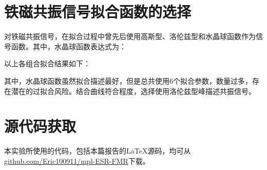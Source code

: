 \documentclass{thuemp}
\begin{document}
\renewcommand\refname{\heiti\wuhao\centerline{参考文献}\global\def\refname{参考文献}}
\vskip 12pt

\let\OLDthebibliography\thebibliography
\renewcommand\thebibliography[1]{
  \OLDthebibliography{#1}
  \setlength{\parskip}{0pt}
  \setlength{\itemsep}{0pt plus 0.3ex}
}

{
\renewcommand{\baselinestretch}{0.9}
\liuhao


}
\newpage
\appendix

\section{铁磁共振信号拟合函数的选择}

对铁磁共振信号，在拟合过程中曾先后使用高斯型、洛伦兹型和水晶球函数作为信号函数。其中，水晶球函数表达式为：


以上各组合拟合结果如下：


其中，水晶球函数虽然拟合描述最好，但是总共使用6个拟合参数，数量过多，存在潜在的过拟合风险。结合曲线符合程度，选择使用洛伦兹型峰描述共振信号。



\section{源代码获取}

本实验所使用的代码，包括本篇报告的\LaTeX 源码，均可从\url{github.com/Eric100911/mpl-ESR-FMR}下载。
\end{document}
